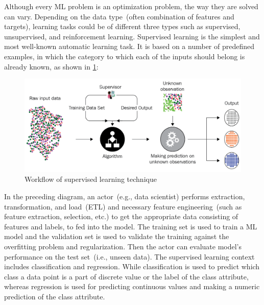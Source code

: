 \hspace*{3.5mm} Although every ML problem is an optimization problem, the way they are solved can vary. Depending on the data type~(often combination of features and targets), learning tasks could be of different three types such as supervised, unsupervised, and reinforcement learning. Supervised learning is the simplest and most well-known automatic learning task. It is based on a number of predefined examples, in which the category to which each of the inputs should belong is already known, as shown in \cref{fig:ml_pipeline_sup}:

\begin{figure}[h]
	\centering
	\includegraphics[scale=0.7]{images/sup.png}
	\caption[Workflow of supervised learning technique]{Workflow of supervised learning technique~\cite{karimScalaML2019}} 
	\label{fig:ml_pipeline_sup}
\end{figure}

\hspace*{3.5mm} In the preceding diagram, an actor~(e.g., data scientist) performs extraction, transformation, and load~(ETL) and necessary feature engineering~(such as feature extraction, selection, etc.) to get the appropriate data consisting of features and labels, to fed into the model. The training set is used to train a ML model and the validation set is used to validate the training against the overfitting problem and regularization. Then the actor can evaluate model's performance on the test set~(i.e., unseen data). The supervised learning context includes classification and regression. While classification is used to predict which class a data point is a part of discrete value or the label of the class attribute, whereas regression is used for predicting continuous values and making a numeric prediction of the class attribute.

